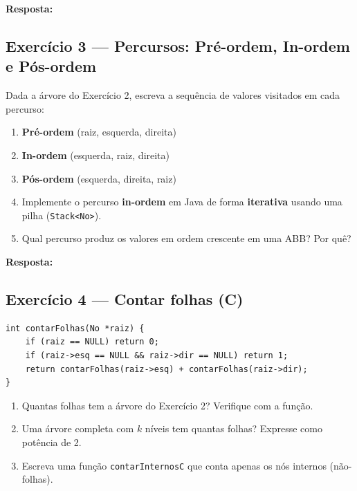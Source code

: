 \documentclass[12pt, a4paper]{article}
\newenvironment{resposta}{%
    \begin{mdframed}[linecolor=black!30, backgroundcolor=white,
                     innertopmargin=10pt, innerbottommargin=30pt,
                     skipabove=6pt]
    \textbf{Resposta:}\\[4pt]
}{%
    \end{mdframed}
}
\begin{document}
\begin{resposta}
\vspace{4cm}
\end{resposta}

\subsection*{Exercício 3 — Percursos: Pré-ordem, In-ordem e Pós-ordem}

Dada a árvore do Exercício 2, escreva a sequência de valores visitados em cada percurso:

\begin{enumerate}[label=(\alph*)]
    \item \textbf{Pré-ordem} (raiz, esquerda, direita)
    \item \textbf{In-ordem} (esquerda, raiz, direita)
    \item \textbf{Pós-ordem} (esquerda, direita, raiz)
    \item Implemente o percurso \textbf{in-ordem} em Java de forma \textbf{iterativa} usando uma pilha (\texttt{Stack<No>}).
    \item Qual percurso produz os valores em ordem crescente em uma ABB? Por quê?
\end{enumerate}

\begin{resposta}
\vspace{5cm}
\end{resposta}

\newpage
\subsection*{Exercício 4 — Contar folhas (C)}

\begin{lstlisting}[style=cstyle]
int contarFolhas(No *raiz) {
    if (raiz == NULL) return 0;
    if (raiz->esq == NULL && raiz->dir == NULL) return 1;
    return contarFolhas(raiz->esq) + contarFolhas(raiz->dir);
}
\end{lstlisting}

\begin{enumerate}[label=(\alph*)]
    \item Quantas folhas tem a árvore do Exercício 2? Verifique com a função.
    \item Uma árvore completa com $k$ níveis tem quantas folhas? Expresse como potência de 2.
    \item Escreva uma função \texttt{contarInternosC} que conta apenas os nós internos (não-folhas).
\end{enumerate}
\end{document}
